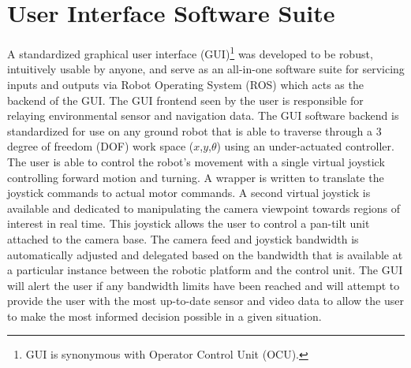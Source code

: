 \section{User Interface Software Suite}\label{sec:ui}

A standardized graphical user interface (GUI)\footnote{GUI is synonymous with Operator Control Unit (OCU).} was developed to be robust, intuitively usable by anyone, and serve as an all-in-one software suite for servicing inputs and outputs via Robot Operating System (ROS) which acts as the backend of the GUI. The GUI frontend seen by the user is responsible for relaying environmental sensor and navigation data. The GUI software backend is standardized for use on any ground robot that is able to traverse through a 3 degree of freedom (DOF) work space ($x$,$y$,$\theta$) using an under-actuated controller. The user is able to control the robot's movement with a single virtual joystick controlling forward motion and turning. A wrapper is written to translate the joystick commands to actual motor commands. A second virtual joystick is available and dedicated to manipulating the camera viewpoint towards regions of interest in real time. This joystick allows the user to control a pan-tilt unit attached to the camera base. The camera feed and joystick bandwidth is automatically adjusted and delegated based on the bandwidth that is available at a particular instance between the robotic platform and the control unit. The GUI will alert the user if any bandwidth limits have been reached and will attempt to provide the user with the most up-to-date sensor and video data to allow the user to make the most informed decision possible in a given situation. 



